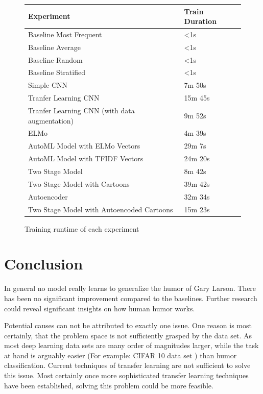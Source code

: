 \documentclass[draft,final,oneside]{vutinfth} %
\begin{document}
\begin{figure}
\centering
\begin{tabular}{|l|l|} 
\hline
\textbf{Experiment}                                    & \textbf{Train Duration}  \\ 
\hline
Baseline Most Frequent                        & \textless{}1s   \\
Baseline Average                              & \textless{}1s   \\
Baseline Random                               & \textless{}1s   \\
Baseline Stratified                           & \textless{}1s   \\
Simple CNN                                    & 7m 50s          \\
Tranfer Learning CNN                          & 15m 45s         \\
Tranfer Learning CNN (with data augmentation) & 9m 52s          \\
ELMo                                          & 4m 39s          \\
AutoML Model with ELMo Vectors                & 29m 7s          \\
AutoML Model with TFIDF Vectors               & 24m 20s         \\
Two Stage Model                               & 8m 42s          \\
Two Stage Model with Cartoons                 & 39m 42s         \\
Autoencoder                                   & 32m 34s         \\
Two Stage Model with Autoencoded Cartoons     & 15m 23s         \\
\hline
\end{tabular}
\caption{Training runtime of each experiment}
\label{trainingruntime}
\end{figure}

\chapter {Conclusion}

In general no model really learns to generalize the humor of Gary Larson. There has been no significant improvement compared to the baselines. Further research could reveal significant insights on how human humor works.

Potential causes can not be attributed to exactly one issue. One reason is most certainly, that the problem space is not sufficiently grasped by the data set. As most deep learning data sets are many order of magnitudes larger, while the task at hand is arguably easier (For example: CIFAR 10 data set \cite{dogsvscats}) than humor classification. Current techniques of transfer learning are not sufficient to solve this issue. Most certainly once more sophisticated transfer learning techniques have been established, solving this problem could be more feasible. 
\end{document}
